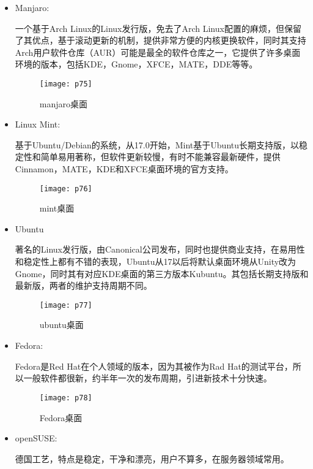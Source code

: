 \documentclass[utf8]{book}
\begin{document}
	 \begin{itemize}
	   \item Manjaro:
	    
	    一个基于Arch Linux的Linux发行版，免去了Arch Linux配置的麻烦，但保留了其优点，基于滚动更新的机制，提供非常方便的内核更换软件，同时其支持Arch用户软件仓库（AUR）可能是最全的软件仓库之一，它提供了许多桌面环境的版本，包括KDE，Gnome，XFCE，MATE，DDE等等。
	   	\begin{figure}[H]
		   	\centering
		   	\texttt{[image: p75]}
		   	\caption{manjaro桌面}
	   \end{figure}
	   \item Linux Mint:
	   
	   基于Ubuntu/Debian的系统，从17.0开始，Mint基于Ubuntu长期支持版，以稳定性和简单易用著称，但软件更新较慢，有时不能兼容最新硬件，提供Cinnamon，MATE，KDE和XFCE桌面环境的官方支持。
	   
	   \begin{figure}[H]
	   	\centering
	   	\texttt{[image: p76]}
	   	\caption{mint桌面}
	   \end{figure}
   
	   \item Ubuntu
	   
	    著名的Linux发行版，由Canonical公司发布，同时也提供商业支持，在易用性和稳定性上都有不错的表现，Ubuntu从17以后将默认桌面环境从Unity改为Gnome，同时其有对应KDE桌面的第三方版本Kubuntu。其包括长期支持版和最新版，两者的维护支持周期不同。
	    
	    \begin{figure}[H]
	    	\centering
	    	\texttt{[image: p77]}
	    	\caption{ubuntu桌面}
	    \end{figure}
	   \item Fedora:
	   
	   Fedora是Red Hat在个人领域的版本，因为其被作为Rad Hat的测试平台，所以一般软件都很新，约半年一次的发布周期，引进新技术十分快速。
		\begin{figure}[H]
			\centering
			\texttt{[image: p78]}
			\caption{Fedora桌面}
		\end{figure}
	
	   \item openSUSE:
	   
	    德国工艺，特点是稳定，干净和漂亮，用户不算多，在服务器领域常用。
	    

\end{itemize}
\end{document}
